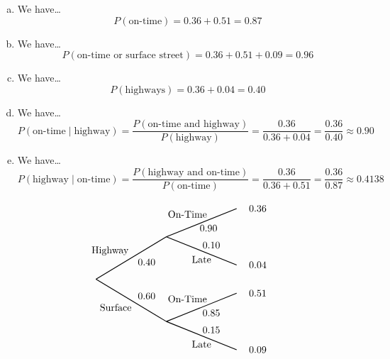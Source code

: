 \documentclass[11pt,letterpaper]{article}
\begin{document}
\sol 
\begin{enumerate}[(a)]
\item We have\dots
	\[
	P(\text{on-time})= 0.36 + 0.51= 0.87
	\] \pspace

\item We have\dots
	\[
	P(\text{on-time or surface street})= 0.36 + 0.51 + 0.09= 0.96
	\] \pspace

\item We have\dots
	\[
	P(\text{highways})= 0.36 + 0.04= 0.40
	\] \pspace
	
\item We have\dots
	\[
	P(\text{on-time} \;|\; \text{highway})= \dfrac{P(\text{on-time and highway})}{P(\text{highway})}= \dfrac{0.36}{0.36 + 0.04}= \dfrac{0.36}{0.40} \approx 0.90
	\] \pspace

\item We have\dots
	\[
	P(\text{highway} \;|\; \text{on-time})= \dfrac{P(\text{highway and on-time})}{P(\text{on-time})}= \dfrac{0.36}{0.36 + 0.51}= \dfrac{0.36}{0.87} \approx 0.4138
	\]
\end{enumerate} \vfill

		\[
		\begin{tikzpicture}[scale= 1.0]
		\def\FirstUpLabel{Highway}
		\def\FirstDownLabel{Surface}
		\def\SecondUpLabel{On-Time}
		\def\SecondDownLabel{Late}
		\def\Up{$0.40$}
		\def\Down{$0.60$}
		\def\UpUp{$0.90$}
		\def\UpDown{$0.10$}
		\def\DownUp{$0.85$}
		\def\DownDown{$0.15$}
		\def\first{$0.36$}
		\def\second{$0.04$}
		\def\third{$0.51$}
		\def\fourth{$0.09$}
		
		\node at (0.5,1) {\FirstUpLabel};	
		\node at (0.7,-1) {\FirstDownLabel};	
		\node at (1.8,0.6) {\Up};
		\node at (1.8,-0.6) {\Down};
		\draw[thick] (0,0) -- (2.5,1.5);
		\draw[thick] (0,0) -- (2.5,-1.5);
		
		\node at (3.25,2.3) {\SecondUpLabel};
		\node at (3.75,0.7) {\SecondDownLabel};
		\node at (4,1.8) {\UpUp};
		\node at (4.1,1.2) {\UpDown};
		\node at (5.75,2.5) {\first};
		\node at (5.75,0.5) {\second};
		\draw[thick] (2.5,1.5) -- (5,2.5);
		\draw[thick] (2.5,1.5) -- (5,0.5);

		\node at (3.25,-0.7) {\SecondUpLabel};
		\node at (3.75,-2.3) {\SecondDownLabel};
		\node at (4.1,-1.2) {\DownUp};
		\node at (4.1,-1.8) {\DownDown};
		\node at (5.75,-0.5) {\third};	
		\node at (5.75,-2.5) {\fourth};	
		\draw[thick] (2.5,-1.5) -- (5,-0.5);
		\draw[thick] (2.5,-1.5) -- (5,-2.5);
		\end{tikzpicture}
		\]
\end{document}
